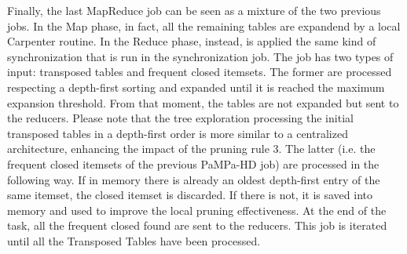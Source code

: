 Finally, the last MapReduce job can be seen as a mixture of the two previous jobs. In the Map phase, in fact, all the remaining tables are expandend by a local Carpenter routine. In the Reduce phase, instead, is applied the same kind of synchronization that is run in the synchronization job. The job has two types of input: transposed tables and frequent closed itemsets. The former are processed respecting a depth-first sorting and expanded until it is reached the maximum expansion threshold. From that moment, the tables are not expanded but sent to the reducers. Please note that the tree exploration processing the initial transposed tables in a depth-first order is more similar to a centralized architecture, enhancing the impact of the pruning rule 3. 
The latter (i.e. the frequent closed itemsets of the previous PaMPa-HD job) are processed in the following way. If in memory there is already an oldest depth-first entry of the same itemset, the closed itemset is discarded. If there is not, it is saved into memory  and used to improve the local pruning effectiveness. At the end of the task, all the frequent closed found are sent to the reducers.
This job is iterated until all the Transposed Tables have been processed.

%




